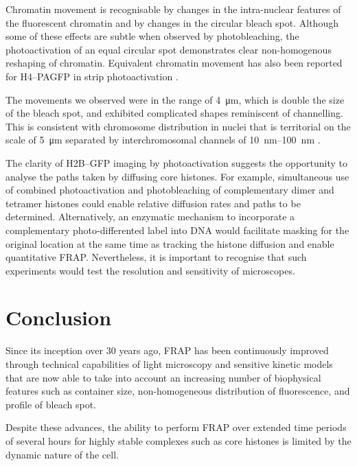     Chromatin movement is recognisable
    by changes in the intra-nuclear features of the fluorescent chromatin
    and by changes in the circular bleach spot.
    Although some of these effects are subtle when observed by photobleaching,
    the photoactivation of an equal circular spot demonstrates
    clear non-homogenous reshaping of chromatin.
    Equivalent chromatin movement has also been reported
    for H4--PAGFP in strip photoactivation \cite{H4PAGFP-chromatin-movement}.

    The movements we observed were in the
    range of \SI{4}{\um}, which is double the size of the bleach spot,
    and exhibited complicated shapes reminiscent of channelling.
    This is consistent with chromosome distribution in nuclei that is
    territorial on the scale of \SI{5}{\um} \citep{sun2000size}
    separated by interchromosomal channels of
    \SIrange{10}{100}{\nm} \citep{gorisch2005histone}.

    The clarity of H2B--GFP imaging by photoactivation
    suggests the opportunity to analyse the
    paths taken by diffusing core histones.
    For example, simultaneous use of combined
    photoactivation and photobleaching
    of complementary dimer and tetramer histones could
    enable relative diffusion rates and paths to be determined.
    Alternatively, an enzymatic mechanism to incorporate a
    complementary photo-differented label
    into DNA  would facilitate masking for
    the original location at the same time as tracking the histone diffusion
    and enable quantitative FRAP.
    Nevertheless, it is important to recognise
    that such experiments would test the
    resolution and sensitivity of microscopes.

\section{Conclusion}

    Since its inception over 30 years ago, FRAP has been continuously
    improved
    through technical capabilities of light microscopy
    and sensitive kinetic models that are now able to take into account
    an increasing number of biophysical features such as container size,
    non-homogeneous distribution of fluorescence, and profile of bleach spot.

    Despite these advances, the ability to perform FRAP
    over extended time periods of several hours for highly stable complexes
    such as core histones is limited by the dynamic nature of the cell.

